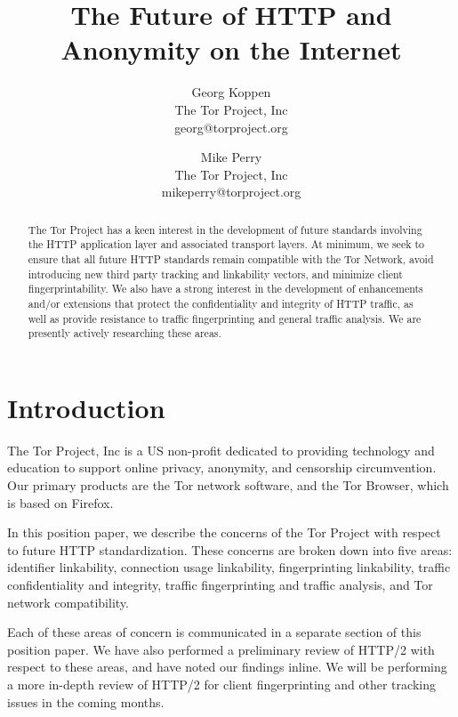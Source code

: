 \documentclass[letterpaper,11pt]{llncs}
\begin{document}
\title{The Future of HTTP and Anonymity on the Internet}

\author{Georg Koppen \\ The Tor Project, Inc \\ georg@torproject.org}
\author{Mike Perry \\ The Tor Project, Inc \\ mikeperry@torproject.org}


\maketitle
\pagestyle{plain}

\begin{abstract}

The Tor Project has a keen interest in the development of future standards
involving the HTTP application layer and associated transport layers. At
minimum, we seek to ensure that all future HTTP standards remain compatible
with the Tor Network, avoid introducing new third party tracking and
linkability vectors, and minimize client fingerprintability. We also have a
strong interest in the development of enhancements and/or extensions that
protect the confidentiality and integrity of HTTP traffic, as well as provide
resistance to traffic fingerprinting and general traffic analysis. We are
presently actively researching these areas.

\end{abstract}

\section{Introduction}

The Tor Project, Inc is a US non-profit dedicated to providing technology and
education to support online privacy, anonymity, and censorship circumvention.
Our primary products are the Tor network software, and the Tor Browser, which
is based on Firefox. 

In this position paper, we describe the concerns of the Tor Project with
respect to future HTTP standardization. These concerns are broken down into
five areas: identifier linkability, connection usage linkability,
fingerprinting linkability, traffic confidentiality and integrity, traffic
fingerprinting and traffic analysis, and Tor network compatibility.

Each of these areas of concern is communicated in a separate section of this
position paper. We have also performed a preliminary review of HTTP/2 with
respect to these areas, and have noted our findings inline. We will be
performing a more in-depth review of HTTP/2 for client fingerprinting and
other tracking issues in the coming months. 
\end{document}
